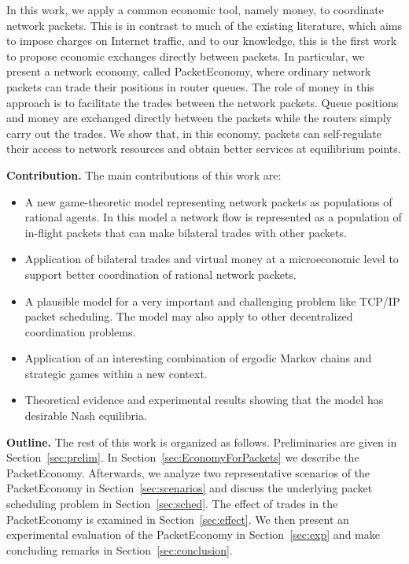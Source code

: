 \documentclass[letterpaper,10pt]{llncs}
\begin{document}
In this work, we apply a common economic tool, namely money,
to coordinate network packets. This is in contrast to much of the existing literature,
which aims to impose charges on Internet traffic, and to our knowledge,
this is the first work to propose economic exchanges directly between packets.
In particular, we present a network economy, called PacketEconomy, where
ordinary network packets can trade their positions in router queues.
The role of money in this approach is to facilitate the trades between the network packets.
Queue positions and money are exchanged directly between
the packets while the routers simply carry out the trades.
We show that, in this economy, packets can self-regulate their
access to network resources and obtain better services at equilibrium points.

\vspace{0.2cm}
\noindent
{\bf Contribution.} The main contributions of this work are:
\begin{itemize}
\renewcommand{\labelitemi}{$\bullet$}
\item A new game-theoretic model representing network packets as populations of rational agents.
In this model a network flow is represented as a population of in-flight packets that can make 
bilateral trades with other packets.
\item Application of bilateral trades and virtual money at a microeconomic level to  
support better coordination of rational network packets.
\item A plausible model for a very important and challenging problem like 
TCP/IP packet scheduling. The model may also apply to other decentralized 
coordination problems.
\item Application of an interesting combination of ergodic Markov chains and strategic
games within a new context.
\item Theoretical evidence and experimental results showing that the model has 
desirable Nash equilibria.
\end{itemize}

\vspace{0.2cm}
\noindent
{\bf Outline.} The rest of this work is organized as follows. 
Preliminaries are given in Section~\ref{sec:prelim}.
In Section~\ref{sec:EconomyForPackets} we describe the PacketEconomy.
Afterwards, we analyze two representative scenarios of the PacketEconomy
in Section~\ref{sec:scenarios} and discuss the underlying packet scheduling 
problem in Section~\ref{sec:sched}. 
The effect of trades in the PacketEconomy is examined in Section~\ref{sec:effect}. 
We then present an experimental evaluation of the PacketEconomy in Section~\ref{sec:exp} 
and make concluding remarks in Section~\ref{sec:conclusion}. 
\end{document}
